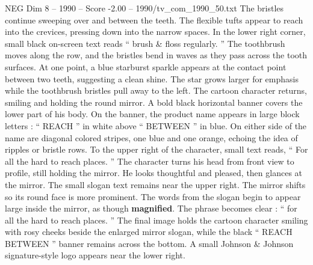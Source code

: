 \begin{textsample}{NEG Dim 8 – 1990 – Score -2.00 – 1990/tv\_com\_1990\_50.txt}
The bristles continue sweeping over and between the teeth.
The flexible tufts appear to reach into the crevices, pressing down into the narrow spaces.
In the lower right corner, small black on-screen text reads “ brush \& floss regularly. ” The toothbrush moves along the row, and the bristles bend in waves as they pass across the tooth surfaces.
At one point, a blue starburst sparkle appears at the contact point between two teeth, suggesting a clean shine.
The star grows larger for emphasis while the toothbrush bristles pull away to the left.
The cartoon character returns, smiling and holding the round mirror.
A bold black horizontal banner covers the lower part of his body.
On the banner, the product name appears in large block letters : “ REACH ” in white above “ BETWEEN ” in blue.
On either side of the name are diagonal colored stripes, one blue and one orange, echoing the idea of ripples or bristle rows.
To the upper right of the character, small text reads, “ For all the hard to reach places. ” The character turns his head from front view to profile, still holding the mirror.
He looks thoughtful and pleased, then glances at the mirror.
The small slogan text remains near the upper right.
The mirror shifts so its round face is more prominent.
The words from the slogan begin to appear large inside the mirror, as though \textbf{magnified}.
The phrase becomes clear : “ for all the hard to reach places. ” The final image holds the cartoon character smiling with rosy cheeks beside the enlarged mirror slogan, while the black “ REACH BETWEEN ” banner remains across the bottom.
A small Johnson \& Johnson signature-style logo appears near the lower right.

\end{textsample}
